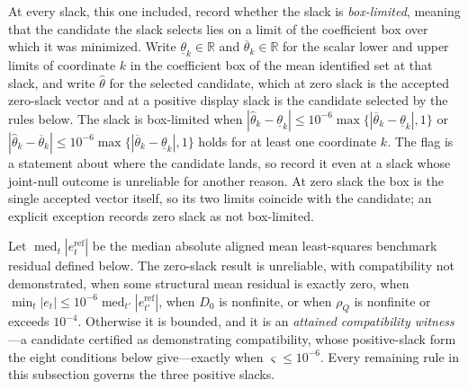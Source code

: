 \documentclass[11pt]{article}
\begin{document}
At every slack, this one included, record whether the slack is \emph{box-limited}, meaning that the
candidate the slack selects lies on a limit of the coefficient box over which it was minimized. Write
\(\underline\theta_k\in\mathbb R\) and \(\overline\theta_k\in\mathbb R\) for the scalar lower and upper limits of coordinate
\(k\) in the coefficient box of the mean identified set at that slack, and write
\(\widehat\theta\) for the selected candidate, which at zero slack is the accepted zero-slack vector
and at a positive display slack is the candidate selected by the rules below. The slack is box-limited when
\(|\widehat\theta_k-\underline\theta_k|\le10^{-6}\max\{|\overline\theta_k-\underline\theta_k|,1\}\) or
\(|\widehat\theta_k-\overline\theta_k|\le10^{-6}\max\{|\overline\theta_k-\underline\theta_k|,1\}\)
holds for at least one coordinate \(k\).
The flag is a statement about where the candidate lands, so record it even at a slack whose joint-null outcome
is unreliable for another reason. At zero slack the box is the single accepted vector itself, so its
two limits coincide with the candidate; an explicit exception records zero slack as not box-limited.

Let \(\operatorname{med}_{t}|e_{t}^{\mathrm{ref}}|\) be the
median absolute aligned mean least-squares benchmark residual defined below. The zero-slack result is
unreliable, with compatibility not demonstrated, when some structural mean residual is exactly zero,
when \(\min_t|e_t|\le10^{-6}\operatorname{med}_{t'}|e_{t'}^{\mathrm{ref}}|\), when \(D_0\) is
nonfinite, or when \(\rho_Q\) is nonfinite or exceeds \(10^{-4}\). Otherwise it is bounded, and it is
an \emph{attained compatibility witness}---a candidate certified as demonstrating compatibility,
whose positive-slack form the eight conditions below give---exactly when
\(\varsigma\le10^{-6}\). Every remaining rule in this
subsection governs the three positive slacks.
\end{document}
